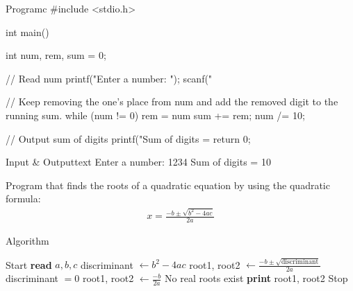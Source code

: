 \documentclass[11pt]{ipu-c}
\begin{document}
    \newpage
    \begin{code}
        {Program}{c}
#include <stdio.h>

int main() {
    int num, rem, sum = 0;

    // Read num
    printf("Enter a number: ");
    scanf("%

    // Keep removing the one's place from num and add the removed digit to the running sum.
    while (num != 0) {
        rem = num %
        sum += rem;
        num /= 10;
    }

    // Output sum of digits
    printf("Sum of digits = %
    return 0;
}
    \end{code}
    \begin{code}
        {Input \& Output}{text}
Enter a number: 1234
Sum of digits = 10
    \end{code}


    {Program that finds the roots of a quadratic equation by using the quadratic formula:\vspace*{-5pt}%
        \begin{align*}%
            x = \frac{-b \pm \sqrt{b^2 - 4ac}}{2a}
        \end{align*}\vspace*{-25pt}}

    \begin{tabularsection}{Algorithm}
        \begin{algorithmic}[1]
            \State Start
            \State \textbf{read} $a, b, c$
            \State discriminant $\gets b^2 - 4ac$
                \State root1, root2 $\gets \frac{-b \pm \sqrt{\text{discriminant}}}{2a}$
            \ElsIf
                    {discriminant $= 0$}
                \State root1, root2 $\gets \frac{-b}{2a}$
            \Else
                \State No real roots exist
            \EndIf
            \State \textbf{print} root1, root2
            \State Stop
        \end{algorithmic}
    \end{tabularsection}
\end{document}
